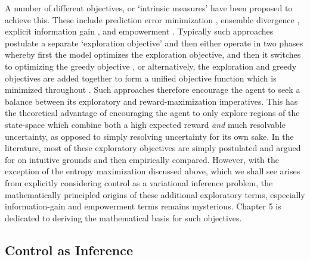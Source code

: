 A number of different objectives, or `intrinsic measures' \citep{oudeyer2009intrinsic} have been proposed to achieve this. These include prediction error minimization \citep{pathak2017curiosity}, ensemble divergence \citep{chua_deep_2018}, explicit information gain \citep{shyam_model-based_2019,tschantz2020reinforcement,sun_planning_2011}, and empowerment \citep{klyubin2005empowerment}. Typically such approaches postulate a separate `exploration objective' and then either operate in two phases whereby first the model optimizes the exploration objective, and then it switches to optimizing the greedy objective \citep{shyam_model-based_2019}, or alternatively, the exploration and greedy objectives are added together to form a unified objective function which is minimized throughout \citep{tschantz2020reinforcement}. Such approaches therefore encourage the agent to seek a balance between its exploratory and reward-maximization imperatives. This has the theoretical advantage of encouraging the agent to only explore regions of the state-space which combine both a high expected reward \emph{and} much resolvable uncertainty, as opposed to simply resolving uncertainty for its own sake. In the literature, most of these exploratory objectives are simply postulated and argued for on intuitive grounds and then empirically compared. However, with the exception of the entropy maximization discussed above, which we shall see arises from explicitly considering control as a variational inference problem, the mathematically principled origins of these additional exploratory terms, especially information-gain and empowerment terms remains mysterious. Chapter 5 is dedicated to deriving the mathematical basis for such objectives.

\subsection{Control as Inference}


